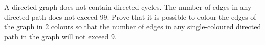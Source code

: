 A directed graph does not contain directed cycles.  The number of edges in any directed path does not exceed 99.  Prove that it is possible to colour the edges of the graph in 2 colours so that the number of edges in any single-coloured directed path in the graph will not exceed 9.